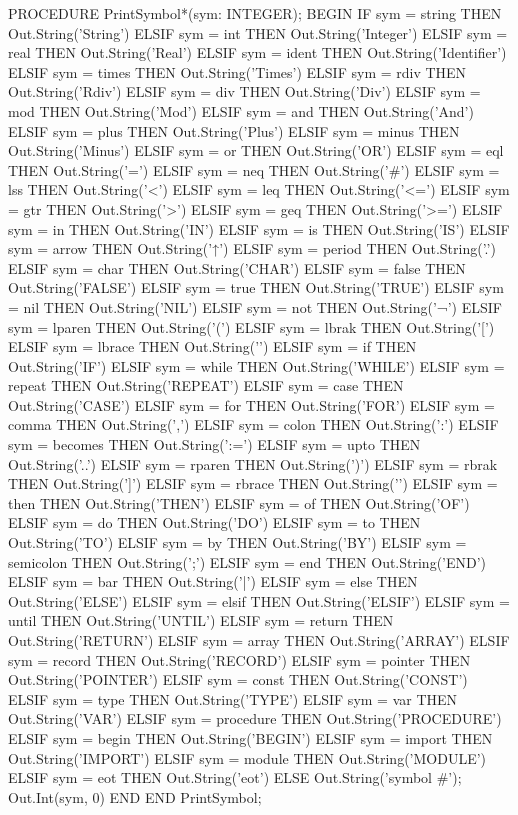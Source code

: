 \documentclass[utf8]{lgu}
\begin{document}
\begin{modula2long}
PROCEDURE PrintSymbol*(sym: INTEGER);
BEGIN
  IF     sym = string   THEN Out.String('String')
  ELSIF sym = int       THEN Out.String('Integer')
  ELSIF sym = real      THEN Out.String('Real')
  ELSIF sym = ident     THEN Out.String('Identifier')
  ELSIF sym = times     THEN Out.String('Times')
  ELSIF sym = rdiv       THEN Out.String('Rdiv')
  ELSIF sym = div        THEN Out.String('Div')
  ELSIF sym = mod       THEN Out.String('Mod')
  ELSIF sym = and       THEN Out.String('And')
  ELSIF sym = plus      THEN Out.String('Plus')
  ELSIF sym = minus     THEN Out.String('Minus')
  ELSIF sym = or        THEN Out.String('OR')
  ELSIF sym = eql       THEN Out.String('=')
  ELSIF sym = neq       THEN Out.String('#')
  ELSIF sym = lss       THEN Out.String('<')
  ELSIF sym = leq       THEN Out.String('<=')
  ELSIF sym = gtr       THEN Out.String('>')
  ELSIF sym = geq       THEN Out.String('>=')
  ELSIF sym = in         THEN Out.String('IN')
  ELSIF sym = is         THEN Out.String('IS')
  ELSIF sym = arrow     THEN Out.String('↑')
  ELSIF sym = period    THEN Out.String('.')
  ELSIF sym = char      THEN Out.String('CHAR')
  ELSIF sym = false     THEN Out.String('FALSE')
  ELSIF sym = true      THEN Out.String('TRUE')
  ELSIF sym = nil        THEN Out.String('NIL')
  ELSIF sym = not       THEN Out.String('¬')
  ELSIF sym = lparen    THEN Out.String('(')
  ELSIF sym = lbrak     THEN Out.String('[')
  ELSIF sym = lbrace    THEN Out.String('{')
  ELSIF sym = if         THEN Out.String('IF')
  ELSIF sym = while      THEN Out.String('WHILE')
  ELSIF sym = repeat    THEN Out.String('REPEAT')
  ELSIF sym = case      THEN Out.String('CASE')
  ELSIF sym = for       THEN Out.String('FOR')
  ELSIF sym = comma    THEN Out.String(',')
  ELSIF sym = colon     THEN Out.String(':')
  ELSIF sym = becomes  THEN Out.String(':=')
  ELSIF sym = upto      THEN Out.String('..')
  ELSIF sym = rparen    THEN Out.String(')')
  ELSIF sym = rbrak     THEN Out.String(']')
  ELSIF sym = rbrace    THEN Out.String('}')
  ELSIF sym = then      THEN Out.String('THEN')
  ELSIF sym = of        THEN Out.String('OF')
  ELSIF sym = do        THEN Out.String('DO')
  ELSIF sym = to        THEN Out.String('TO')
  ELSIF sym = by        THEN Out.String('BY')
  ELSIF sym = semicolon THEN Out.String(';')
  ELSIF sym = end       THEN Out.String('END')
  ELSIF sym = bar       THEN Out.String('|')
  ELSIF sym = else      THEN Out.String('ELSE')
  ELSIF sym = elsif      THEN Out.String('ELSIF')
  ELSIF sym = until      THEN Out.String('UNTIL')
  ELSIF sym = return    THEN Out.String('RETURN')
  ELSIF sym = array     THEN Out.String('ARRAY')
  ELSIF sym = record    THEN Out.String('RECORD')
  ELSIF sym = pointer   THEN Out.String('POINTER')
  ELSIF sym = const     THEN Out.String('CONST')
  ELSIF sym = type      THEN Out.String('TYPE')
  ELSIF sym = var       THEN Out.String('VAR')
  ELSIF sym = procedure THEN Out.String('PROCEDURE')
  ELSIF sym = begin      THEN Out.String('BEGIN')
  ELSIF sym = import     THEN Out.String('IMPORT')
  ELSIF sym = module    THEN Out.String('MODULE')
  ELSIF sym = eot        THEN Out.String('eot')
  ELSE Out.String('symbol #'); Out.Int(sym, 0)
  END
END PrintSymbol;


\end{modula2long}
\end{document}
